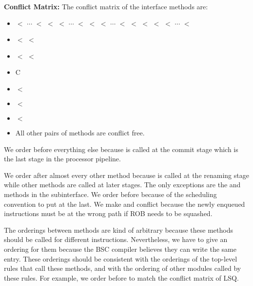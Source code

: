 \noindent\textbf{Conflict Matrix:}
The conflict matrix of the interface methods are:
\begin{itemize}
    \item {} $<$ $\cdots$ $<$  $<$  $<$ $\cdots$ $<$  $<$  $<$ $\cdots$ $<$  $<$  $<$  $<$  $<$ $\cdots$ $<$ 
    \item {} $<$  $<$ 
    \item {} $<$  $<$ 
    \item {} C 
    \item {} $<$ 
    \item {} $<$ 
    \item {} $<$ 
    \item All other pairs of methods are conflict free.
\end{itemize}

We order  before everything else because  is called at the commit stage which is the last stage in the processor pipeline.

We order  after almost every other method because  is called at the renaming stage while other methods are called at later stages.
The only exceptions are the  and  methods in the  subinterface.
We order  before  because of the scheduling convention to put  at the last.
We make  and  conflict because the newly enqueued instructions must be at the wrong path if ROB needs to be squashed.

The orderings between  methods are kind of arbitrary because these methods should be called for different instructions.
Nevertheless, we have to give an ordering for them because the BSC compiler believes they can write the same entry.
These orderings should be consistent with the orderings of the top-level rules that call these methods, and with the ordering of other modules called by these rules.
For example, we order  before  to match the conflict matrix of LSQ.

